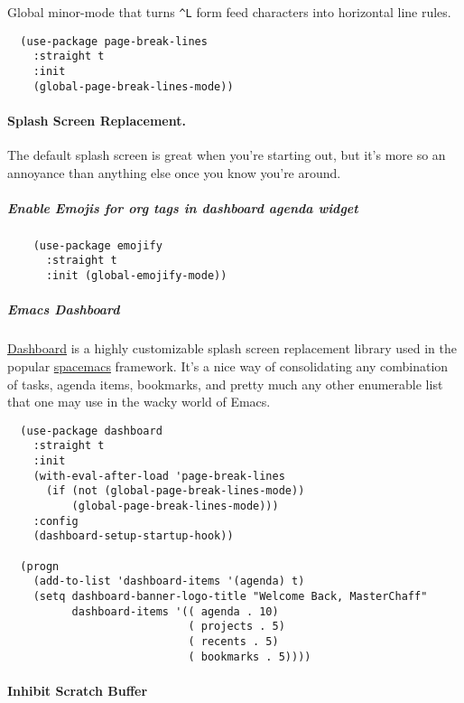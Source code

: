 \documentclass[11pt]{article}
\begin{document}
Global minor-mode that turns \texttt{\textasciicircum{}L} form feed characters into
horizontal line rules.

\begin{verbatim}
  (use-package page-break-lines
    :straight t
    :init
    (global-page-break-lines-mode))
\end{verbatim}

\paragraph*{Splash Screen Replacement.}
\label{sec:org25762b0}

The default splash screen is great when you're starting out,
but it's more so an annoyance than anything else once you
know you're around.

\subparagraph*{Enable Emojis for org tags in dashboard agenda widget}
\label{sec:orgb9a5189}

\begin{verbatim}
    (use-package emojify
      :straight t
      :init (global-emojify-mode))
\end{verbatim}

\subparagraph*{Emacs Dashboard}
\label{sec:org34093f7}

\href{https://github.com/rakanalh/emacs-dashboard}{Dashboard} is a highly customizable splash screen
replacement library used in the popular \href{https://github.com/syl20bnr/spacemacs}{spacemacs} framework.
It's a nice way of consolidating any combination of tasks,
agenda items, bookmarks, and pretty much any other enumerable
list that one may use in the wacky world of Emacs.

\begin{verbatim}
  (use-package dashboard
    :straight t
    :init
    (with-eval-after-load 'page-break-lines
      (if (not (global-page-break-lines-mode))
          (global-page-break-lines-mode)))
    :config
    (dashboard-setup-startup-hook))

  (progn
    (add-to-list 'dashboard-items '(agenda) t)
    (setq dashboard-banner-logo-title "Welcome Back, MasterChaff"
          dashboard-items '(( agenda . 10)
                            ( projects . 5)
                            ( recents . 5)
                            ( bookmarks . 5))))
\end{verbatim}

\paragraph*{Inhibit Scratch Buffer}
\label{sec:orgb833bd1}
\end{document}
